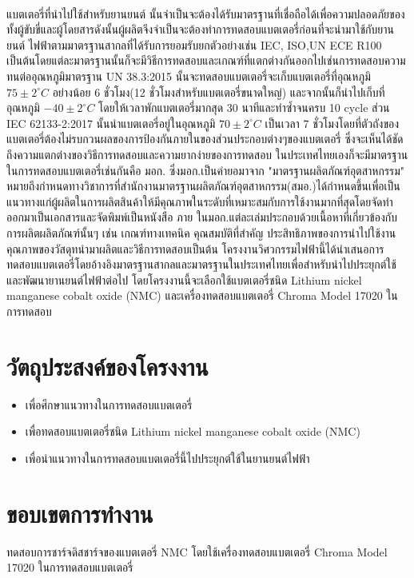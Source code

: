 	\\แบตเตอรี่ที่นำไปใช้สำหรับยานยนต์ นั้นจำเป็นจะต้องได้รับมาตรฐานที่เชื่อถือได้เพื่อความปลอดภัยของทั้งผู้ขับขี่และผู้โดยสารดังนั้นผู้ผลิตจึงจำเป็นจะต้องทำการทดสอบแบตเตอรี่ก่อนที่จะนำมาใช้กับยานยนต์ ไฟฟ้าตามมาตรฐานสากลที่ได้รับการยอมรับยกตัวอย่างเช่น IEC, ISO,UN ECE R100 เป็นต้นโดยแต่ละมาตรฐานนั้นก็จะมีวิธีการทดสอบและเกณฑ์ที่แตกต่างกันออกไปเช่นการทดสอบความทนต่ออุณหภูมิมาตรฐาน UN 38.3:2015 นั้นจะทดสอบแบตเตอรี่จะเก็บแบตเตอรี่ที่อุณหภูมิ $75\pm 2^{\circ}C$  อย่างน้อย 6 ชั่วโมง(12 ชั่วโมงสำหรับแบตเตอรี่ขนาดใหญ่) และจากนั้นก็นำไปเก็บที่อุณหภูมิ $-40\pm 2^{\circ}C$ โดยให้เวลาพักแบตเตอรี่มากสุด 30 นาทีและทำซ้ำจนครบ 10 cycle ส่วน IEC 62133-2:2017 นั้นนำแบตเตอรี่อยู่ในอุณหภูมิ $70\pm 2^{\circ}C$ เป็นเวลา 7 ชั่วโมงโดยที่ตัวถังของแบตเตอรี่ต้องไม่รบกวนผลของการป้องกันภายในของส่วนประกอบต่างๆของแบตเตอรี่\text{\ref{[8]}} ซึ่งจะเห็นได้ชัดถึงความแตกต่างของวิธีการทดสอบและความยากง่ายของการทดสอบ ในประเทศไทยเองก็จะมีมาตรฐานในการทดสอบแบตเตอรี่เช่นกันคือ มอก. ซึ่งมอก.เป็นคํายอมาจาก "มาตรฐานผลิตภัณฑ์อุตสาหกรรม" หมายถึงกําหนดทางวิชาการที่สำนักงานมาตรฐานผลิตภัณฑ์อุตสาหกรรม(สมอ.)ได้กําหนดขึ้นเพื่อเป็นแนวทางแก่ผู้ผลิตในการผลิตสินค้าให้มีคุณภาพในระดับที่เหมาะสมกับการใช้งานมากที่สุดโดยจัดทำออกมาเป็นเอกสารและจัดพิมพ์เป็นหนังสือ ภาย ในมอก.แต่ละเล่มประกอบด้วยเนื้อหาที่เกี่ยวข้องกับการผลิตผลิตภัณฑ์นั้นๆ เช่น เกณฑ์ทางเทคนิค คุณสมบัติที่สําคัญ ประสิทธิภาพของการนําไปใช้งาน คุณภาพของวัสดุทนํามาผลิตและวิธีการทดสอบเป็นต้น
	โครงงานวิศวกรรมไฟฟ้านี้ได้นำเสนอการทดสอบแบตเตอรี่โดยอ้างอิงมาตรฐานสากลและมาตรฐานในประเทศไทยเพื่อสำหรับนำไปประยุกต์ใช้และพัฒนายานยนต์ไฟฟ้าต่อไป โดยโครงงานนี้จะเลือกใช้แบตเตอรี่ชนิด Lithium nickel manganese cobalt oxide (NMC) และเครื่องทดสอบแบตเตอรี่ Chroma Model 17020 ในการทดสอบ
\section{วัตถุประสงค์ของโครงงาน}
\begin{itemize}
  \item เพื่อศึกษาแนวทางในการทดสอบแบตเตอรี่
  \item เพื่อทดสอบแบตเตอรี่ชนิด Lithium nickel manganese cobalt oxide (NMC)
  \item เพื่อนำแนวทางในการทดสอบแบตเตอรี่นี้ไปประยุกต์ใช้ในยานยนต์ไฟฟ้า
\end{itemize}
\section{ขอบเขตการทำงาน}
ทดสอบการชาร์จดิสชาร์จของแบตเตอรี่ NMC โดยใช้เครื่องทดสอบแบตเตอรี่ Chroma Model 17020 ในการทดสอบแบตเตอรี่
